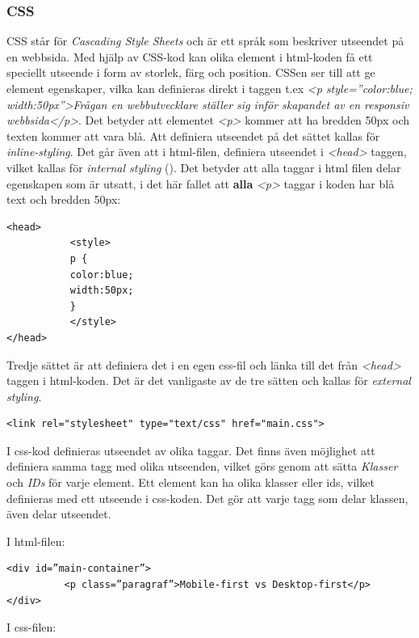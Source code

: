 \documentclass[11pt]{article}
\begin{document}
\subsubsection{CSS}
CSS står för \textit{Cascading Style Sheets} och är ett språk som beskriver utseendet på en webbsida.
Med hjälp av CSS-kod kan olika element i html-koden få ett speciellt utseende i form av storlek, färg och position. CSSen ser till att ge element egenskaper, vilka kan definieras direkt i taggen t.ex \textit{<p style=”color:blue; width:50px”>Frågan en webbutvecklare ställer sig inför skapandet av en responsiv webbsida</p>}. Det betyder att elementet \textit{<p>} kommer att ha bredden 50px och texten kommer att vara blå. Att definiera utseendet på det sättet kallas för \textit{inline-styling}. Det går även att i html-filen, definiera utseendet i \textit{<head>} taggen, vilket kallas för \textit{internal styling} (\cite{css}). Det betyder att alla taggar i html filen delar egenskapen som är utsatt, i det här fallet att \textbf{alla} \textit{<p>} taggar i koden har blå text och bredden 50px:

\vspace{0.3cm}
\begin{verbatim}
<head>
           <style>
           p {
           color:blue;
           width:50px;
           }
           </style>
</head>
\end{verbatim}
\vspace{0.3cm}

Tredje sättet är att definiera det i en egen css-fil och länka till det från \textit{<head>} taggen i html-koden. Det är det vanligaste av de tre sätten och kallas för \textit{external styling}.
\vspace{0.3cm}
\begin{verbatim}
<link rel="stylesheet" type="text/css" href="main.css">
\end{verbatim}
\vspace{0.3cm}

I css-kod definieras utseendet av olika taggar. Det finns även möjlighet att definiera samma tagg med olika utseenden, vilket görs genom att sätta \textit{Klasser} och \textit{IDs} för varje element. Ett element kan ha olika klasser eller ids, vilket definieras med ett utseende i css-koden. Det gör att varje tagg som delar klassen, även delar utseendet.

\vspace{0.3cm}
I html-filen:

\begin{verbatim}
<div id=”main-container”>
          <p class=”paragraf”>Mobile-first vs Desktop-first</p>
</div>
\end{verbatim}
\vspace{0.4cm}
I css-filen:
\end{document}
